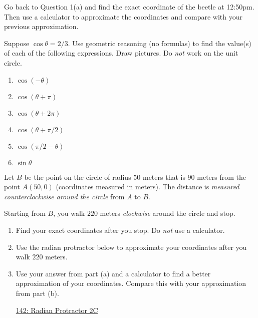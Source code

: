 \documentclass{ximera}
\begin{document}
\begin{question} \label{Q99f3332}
Go back to Question 1(a) and find the exact coordinate of the beetle at 12:50pm. Then use a calculator to approximate the coordinates and compare with your previous approximation.
\end{question}

\begin{question} \label{Q9df3rFDD}
Suppose $\cos\theta =2/3$. Use geometric reasoning (no formulas) to find the value(s) of each of the following expressions. Draw pictures. Do \emph{not} work on the unit circle.

\begin{enumerate}
\item $\cos(-\theta)$

\item $\cos(\theta+\pi)$

\item $\cos(\theta+2\pi)$

\item $\cos(\theta+\pi/2)$

\item  $\cos(\pi/2 - \theta)$

\item $\sin\theta$


\end{enumerate}
\end{question}








\begin{example}  \label{Exp89dsfrer94444}

Let $B$ be the point on the circle of radius $50$ meters that is $90$ meters from the point $A(50,0)$  (coordinates measured in meters). The distance is \emph{measured counterclockwise around the circle} from $A$ to $B$. 

Starting from $B$, you walk  $220$ meters \emph{clockwise} around the circle and stop.

\begin{enumerate}

\item Find your exact coordinates after you stop. Do \emph{not} use a calculator.

\item Use the radian protractor below to approximate your coordinates after you walk $220$ meters.
 
\item Use your answer from part (a) and a calculator to find a better approximation of your coordinates. Compare this with your approximation from part (b).

\begin{onlineOnly}
    \begin{center}
\end{center}
\end{onlineOnly}

\href{https://www.desmos.com/calculator/lbkveixdno}{142: Radian Protractor 2C}

\end{enumerate}

\end{example}
\end{document}
